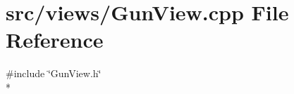 \section{src/views/\-Gun\-View.cpp File Reference}
\label{_gun_view_8cpp}
{\ttfamily \#include \char`\"{}Gun\-View.\-h\char`\"{}}\\*
